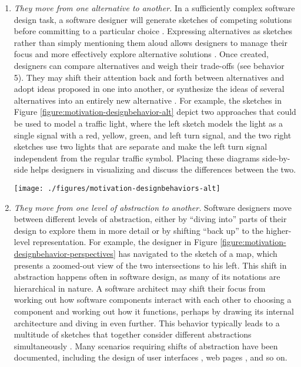 \begin{enumerate}
 \item \emph{They move from one alternative to another.} In a sufficiently complex software design task, a software designer will generate sketches of competing solutions before committing to a particular choice \cite{zannier2007comparing}. Expressing alternatives as sketches rather than simply mentioning them aloud allows designers to manage their focus and more effectively explore alternative solutions \cite{myers2008designers}. Once created, designers can compare alternatives and weigh their trade-offs \cite{buxton2010sketching} (see behavior 5). They may shift their attention back and forth between alternatives and adopt ideas proposed in one into another, or synthesize the ideas of several alternatives into an entirely new alternative \cite{jones1992design}. For example, the sketches in Figure \ref{figure:motivation-designbehavior-alt} depict two approaches that could be used to model a traffic light, where the left sketch models the light as a single signal with a red, yellow, green, and left turn signal, and the two right sketches use two lights that are separate and make the left turn signal independent from the regular traffic symbol. Placing these diagrams side-by-side helps designers in visualizing and discuss the differences between the two. 

\begin{figure*}[tbh]
  \centering
  \texttt{[image: ./figures/motivation-designbehaviors-alt]}
  \caption{Two diagrams that designers used to discuss competing alternative approaches for modeling a traffic light.}
  \label{figure:motivation-designbehavior-alt}
\end{figure*}   

 \item \emph{They move from one level of abstraction to another.} Software designers move between different levels of abstraction, either by ``diving into'' parts of their design to explore them in more detail or by shifting ``back up'' to the higher-level representation. For example, the designer in Figure \ref{figure:motivation-designbehavior-perspectives} has navigated to the sketch of a map, which presents a zoomed-out view of the two intersections to his left. This shift in abstraction happens often in software design, as many of its notations are hierarchical in nature. A software architect may shift their focus from working out how software components interact with each other to choosing a component and working out how it functions, perhaps by drawing its internal architecture and diving in even further. This behavior typically leads to a multitude of sketches that together consider different abstractions simultaneously \cite{petre2009insights}. Many scenarios requiring shifts of abstraction have been documented, including the design of user interfaces \cite{da2001user}, web pages \cite{van2003design}, and so on.


\end{enumerate}
